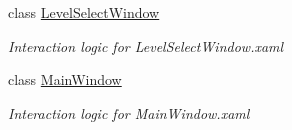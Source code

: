 \begin{DoxyCompactItemize}
class \mbox{\hyperlink{class_bomberman_1_1_u_i_1_1_level_select_window}{Level\+Select\+Window}}
\begin{DoxyCompactList}\small\item\em Interaction logic for Level\+Select\+Window.\+xaml \end{DoxyCompactList}\item 
class \mbox{\hyperlink{class_bomberman_1_1_u_i_1_1_main_window}{Main\+Window}}
\begin{DoxyCompactList}\small\item\em Interaction logic for Main\+Window.\+xaml \end{DoxyCompactList}\end{DoxyCompactItemize}
